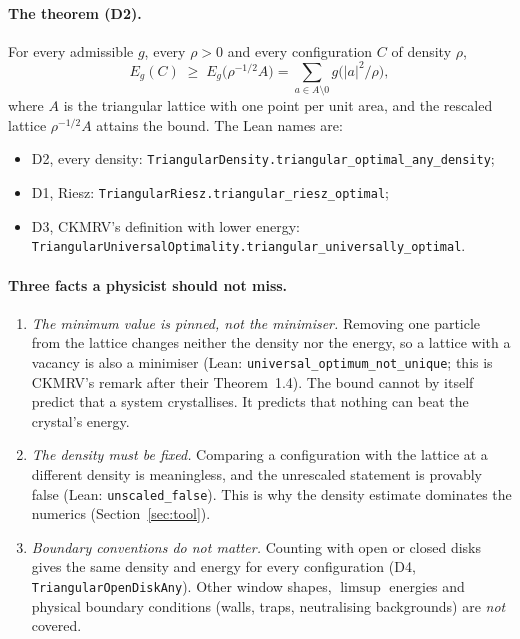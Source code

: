 \documentclass[11pt,a4paper]{article}
\newcommand{\code}[1]{\texttt{#1}}
\begin{document}
\paragraph{The theorem (D2).} For every admissible $g$, every $\rho>0$ and every configuration $C$ of density $\rho$,
\begin{equation}
  E_g(C)\;\ge\;E_g\bigl(\rho^{-1/2}A\bigr)=\sum_{a\in A\setminus 0} g\bigl(|a|^2/\rho\bigr),
  \label{eq:bound}
\end{equation}
where $A$ is the triangular lattice with one point per unit area, and the rescaled lattice $\rho^{-1/2}A$ attains the
bound. The Lean names are:
\begin{itemize}\setlength\itemsep{0pt}\small
\item D2, every density: \code{TriangularDensity.triangular\_optimal\_any\_density};
\item D1, Riesz: \code{TriangularRiesz.triangular\_riesz\_optimal};
\item D3, CKMRV's definition with lower energy:\\ \code{TriangularUniversalOptimality.triangular\_universally\_optimal}.
\end{itemize}

\paragraph{Three facts a physicist should not miss.}
\begin{enumerate}
\item \emph{The minimum value is pinned, not the minimiser.} Removing one particle from the lattice changes neither
the density nor the energy, so a lattice with a vacancy is also a minimiser (Lean:
\code{universal\_optimum\_not\_unique}; this is CKMRV's remark after their Theorem~1.4). The bound cannot by itself
predict that a system crystallises. It predicts that nothing can beat the crystal's energy.
\item \emph{The density must be fixed.} Comparing a configuration with the lattice at a different density is
meaningless, and the unrescaled statement is provably false (Lean: \code{unscaled\_false}). This is why the density
estimate dominates the numerics (Section~\ref{sec:tool}).
\item \emph{Boundary conventions do not matter.} Counting with open or closed disks gives the same density and energy
for every configuration (D4, \code{TriangularOpenDiskAny}). Other window shapes, $\limsup$ energies and physical
boundary conditions (walls, traps, neutralising backgrounds) are \emph{not} covered.
\end{enumerate}
\end{document}
